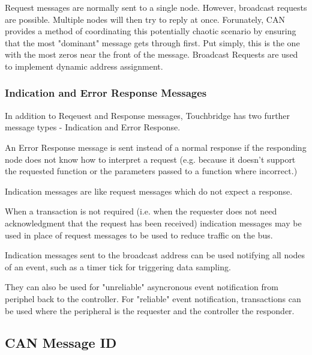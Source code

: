 \documentclass[12pt]{article}
\begin{document}
Request messages are normally sent to a single node. However, broadcast
requests are possible. Multiple nodes will then try to reply at once.
Forunately, CAN provides a method of coordinating this potentially chaotic
scenario by ensuring that the most "dominant" message gets through first. Put
simply, this is the one with the most zeros near the front of the message.
Broadcast Requests are used to implement dynamic address assignment.


\subsubsection{Indication and Error Response Messages}

In addition to Reqeuest and Response messages, Touchbridge has two further
message types - Indication and Error Response.

An Error Response message is sent instead of a normal response if the
responding node does not know how to interpret a request (e.g. because it
doesn't support the requested function or the parameters passed to a function
where incorrect.)

Indication messages are like request messages which do not expect a response.

When a transaction is not required (i.e. when the requester does not need
acknowledgment that the request has been received) indication messages may be
used in place of request messages to be used to reduce traffic on the bus.

Indication messages sent to the broadcast address can be used notifying all
nodes of an event, such as a timer tick for triggering data sampling.

They can also be used for "unreliable" asyncronous event notification from
periphel back to the controller. For "reliable" event notification,
transactions can be used where the peripheral is the requester and the
controller the responder.



\subsection{CAN Message ID}
\end{document}
